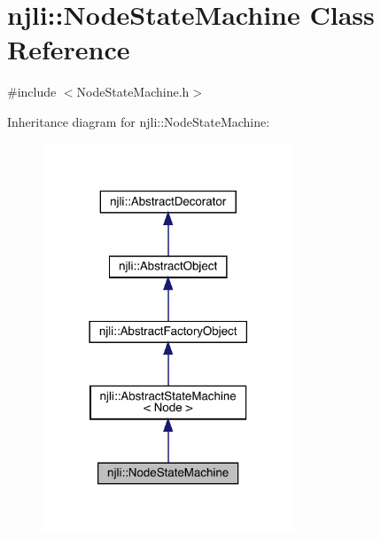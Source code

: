\hypertarget{classnjli_1_1_node_state_machine}{}\section{njli\+:\+:Node\+State\+Machine Class Reference}
\label{classnjli_1_1_node_state_machine}


{\ttfamily \#include $<$Node\+State\+Machine.\+h$>$}



Inheritance diagram for njli\+:\+:Node\+State\+Machine\+:\nopagebreak
\begin{figure}[H]
\begin{center}
\leavevmode
\includegraphics[width=213pt]{classnjli_1_1_node_state_machine__inherit__graph}
\end{center}
\end{figure}


